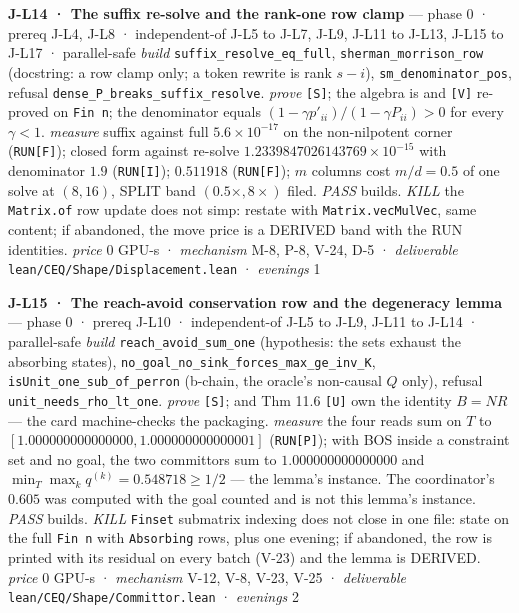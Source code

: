 \documentclass[11pt,a4paper]{article}
\theoremstyle{plain}
\theoremstyle{definition}
\theoremstyle{remark}
\begin{document}
\textbf{J-L14 · The suffix re-solve and the rank-one row clamp} ---
phase 0 · prereq J-L4, J-L8 · independent-of J-L5 to J-L7, J-L9, J-L11
to J-L13, J-L15 to J-L17 · parallel-safe \emph{build}
\texttt{suffix\_resolve\_eq\_full}, \texttt{sherman\_morrison\_row}
(docstring: a row clamp only; a token rewrite is rank \(s-i\)),
\texttt{sm\_denominator\_pos}, refusal
\texttt{dense\_P\_breaks\_suffix\_resolve}. \emph{prove}
\texttt{{[}S{]}}; the algebra is \citep{sherman-1950-inverse-adjustment}
and \citep{hager-1989-updating} \texttt{{[}V{]}} re-proved on
\texttt{Fin\ n}; the denominator equals
\((1-\gamma p'_{ii})/(1-\gamma P_{ii})>0\) for every \(\gamma<1\).
\emph{measure} suffix against full \(5.6\times10^{-17}\) on the
non-nilpotent corner (\texttt{RUN{[}F{]}}); closed form against re-solve
\(1.2339847026143769\times10^{-15}\) with denominator \(1.9\)
(\texttt{RUN{[}I{]}}); \(0.511918\) (\texttt{RUN{[}F{]}}); \(m\) columns
cost \(m/d=0.5\) of one solve at \((8,16)\), SPLIT band
\((0.5\times, 8\times)\) filed. \emph{PASS} builds. \emph{KILL} the
\texttt{Matrix.of} row update does not simp: restate with
\texttt{Matrix.vecMulVec}, same content; if abandoned, the move price is
a DERIVED band with the RUN identities. \emph{price} \(0\) GPU-s ·
\emph{mechanism} M-8, P-8, V-24, D-5 · \emph{deliverable}
\texttt{lean/CEQ/Shape/Displacement.lean} · \emph{evenings} 1

\textbf{J-L15 · The reach-avoid conservation row and the degeneracy
lemma} --- phase 0 · prereq J-L10 · independent-of J-L5 to J-L9, J-L11
to J-L14 · parallel-safe \emph{build} \texttt{reach\_avoid\_sum\_one}
(hypothesis: the sets exhaust the absorbing states),
\texttt{no\_goal\_no\_sink\_forces\_max\_ge\_inv\_K},
\texttt{isUnit\_one\_sub\_of\_perron} (b-chain, the oracle's non-causal
\(Q\) only), refusal \texttt{unit\_needs\_rho\_lt\_one}. \emph{prove}
\texttt{{[}S{]}}; \citep{kemeny-1976-finite} and
\citep{grinstead-1997-probability} Thm 11.6 \texttt{{[}U{]}} own the
identity \(B=NR\) --- the card machine-checks the packaging.
\emph{measure} the four reads sum on \(T\) to
\([1.000000000000000, 1.000000000000001]\) (\texttt{RUN{[}P{]}}); with
BOS inside a constraint set and no goal, the two committors sum to
\(1.000000000000000\) and \(\min_T\max_k q^{(k)}=0.548718\ge1/2\) ---
the lemma's instance. The coordinator's \(0.605\) was computed with the
goal counted and is not this lemma's instance. \emph{PASS} builds.
\emph{KILL} \texttt{Finset} submatrix indexing does not close in one
file: state on the full \texttt{Fin\ n} with \texttt{Absorbing} rows,
plus one evening; if abandoned, the row is printed with its residual on
every batch (V-23) and the lemma is DERIVED. \emph{price} \(0\) GPU-s ·
\emph{mechanism} V-12, V-8, V-23, V-25 · \emph{deliverable}
\texttt{lean/CEQ/Shape/Committor.lean} · \emph{evenings} 2
\end{document}
